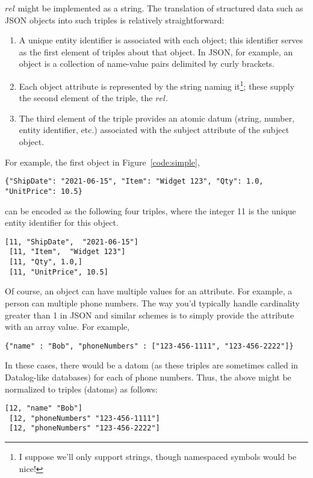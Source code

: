 \documentclass[9pt,letterpaper]{article}
\newcommand{\stt}[1]{\begin{footnotesize}\texttt{#1}\end{footnotesize}}
\begin{document}
$rel$ might be implemented as a string.
The translation of structured data such as JSON objects into such triples is relatively straightforward:
\begin{enumerate}
\item A unique entity identifier is associated with each object; this identifier serves as the first element of triples about that object.
      In JSON, for example, an object is a collection of name-value pairs delimited by curly brackets.
\item Each object attribute is represented by the string naming it\footnote{I suppose we'll only support strings, though namespaced symbols would be nice!}; these supply the second element of the triple, the $rel$.
\item The third element of the triple provides an atomic datum (string, number, entity identifier, etc.) associated with the subject attribute of the subject object.
\end{enumerate}

For example, the first object in Figure~\ref{code:simple}, \stt{\{"ShipDate":  "2021-06-15", "Item":  "Widget 123", "Qty": 1.0, "UnitPrice": 10.5\}} can be encoded as
the following four triples, where the integer 11 is the unique entity identifier for this object.

\begin{lstlisting}[basicstyle=\ttfamily\scriptsize]
 [11, "ShipDate",  "2021-06-15"]
 [11, "Item",  "Widget 123"]
 [11, "Qty", 1.0,]
 [11, "UnitPrice", 10.5]
\end{lstlisting}

Of course, an object can have multiple values for an attribute.
For example, a person can multiple phone numbers.
The way you'd typically handle cardinality greater than 1 in JSON and similar schemes is to simply provide the attribute with an array value.
For example,

\begin{lstlisting}[basicstyle=\ttfamily\scriptsize]
 {"name" : "Bob", "phoneNumbers" : ["123-456-1111", "123-456-2222"]}
\end{lstlisting}

In these cases, there would be a datom (as these triples are sometimes called in Datalog-like databases) for each of phone numbers.
Thus, the above might be normalized to triples (datoms) as follows:

\begin{lstlisting}[basicstyle=\ttfamily\scriptsize]
 [12, "name" "Bob"]
 [12, "phoneNumbers" "123-456-1111"]
 [12, "phoneNumbers" "123-456-2222"]
\end{lstlisting}
\end{document}

